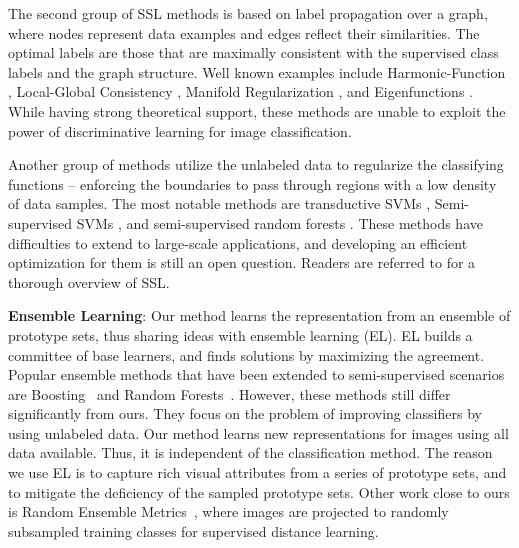 \documentclass[preprint,12pt,3p]{elsarticle}
\begin{document}
The second group of SSL methods is based on label propagation over a
graph, where nodes represent data examples and edges reflect their
similarities. The optimal labels are those that are maximally
consistent with the supervised class labels and the graph
structure. Well known examples include Harmonic-Function
\citep{Zhu:Harmonic:03}, Local-Global Consistency \citep{Zhou:nips:04},
Manifold Regularization \citep{Belkin:semiframe:2006}, and
Eigenfunctions \citep{Fergus09}. While having strong theoretical
support, these methods are unable to exploit the power of
discriminative learning for image classification.

Another group of methods utilize the unlabeled data to regularize the
classifying functions -- enforcing the boundaries to pass through
regions with a low density of data samples. The most notable methods
are transductive SVMs \citep{Joachims:1999}, Semi-supervised
SVMs \citep{SemiSVM}, and semi-supervised random
forests \citep{SemiForest}. These methods have difficulties to extend to
large-scale applications, and developing an efficient optimization for
them is still an open question.  Readers are referred
to \citep{Zhu:ISL:2009} for a thorough overview of SSL.





\textbf{Ensemble Learning}: Our method learns the representation from
an ensemble of prototype sets, thus sharing ideas with ensemble
learning (EL). EL builds a committee of base learners, and finds
solutions by maximizing the agreement. Popular ensemble methods that
have been extended to semi-supervised scenarios are
Boosting~\citep{SemiBoost} and Random
Forests~\citep{SemiForest}. However, these methods still differ
significantly from ours. They focus on the problem of improving
classifiers by using unlabeled data. Our method learns new
representations for images using all data available. Thus, it is
independent of the classification method. The reason we use EL is to
capture rich visual attributes from a series of prototype sets, and to
mitigate the deficiency of the sampled prototype sets. Other work
close to ours is 
Random Ensemble Metrics~\citep{ensemble:iccv11}, where images are
projected to randomly subsampled training classes for supervised
distance learning.
\end{document}
